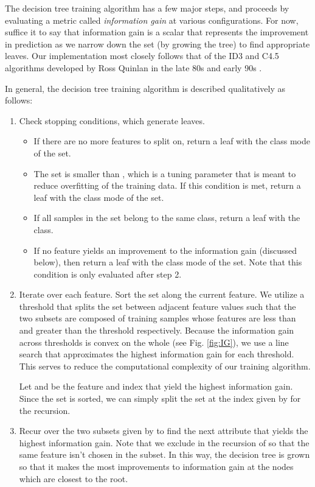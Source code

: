 The decision tree training algorithm has a few major steps, and proceeds by evaluating a metric called \emph{information gain} at various configurations. For now, suffice it to say that information gain is a scalar that represents the improvement in prediction as we narrow down the set (by growing the tree) to find appropriate leaves. Our implementation most closely follows that of the ID3 and C4.5 algorithms developed by Ross Quinlan in the late 80s and early 90s \cite{wiki:id3} \cite{wiki:c45}.

\pagebreak
In general, the decision tree training algorithm is described qualitatively as follows:
%
\begin{enumerate}
\item Check stopping conditions, which generate leaves.
%
  \begin{itemize}
  \item If there are no more features to split on, return a leaf with the class mode of the set. 
  \item The set is smaller than , which is a tuning parameter that is meant to reduce overfitting of the training data. If this condition is met, return a leaf with the class mode of the set.
  \item If all samples in the set belong to the same class, return a leaf with the class.
  \item If no feature yields an improvement to the information gain (discussed below), then return a leaf with the class mode of the set. Note that this condition is only evaluated after step 2. 
  \end{itemize}
\item Iterate over each feature. Sort the set along the current feature. We utilize a threshold that splits the set between adjacent feature values such that the two subsets are composed of training samples whose features are less than and greater than the threshold respectively. Because the information gain across thresholds is convex on the whole (see Fig. \ref{fig:IG}), we use a line search that approximates the highest information gain for each threshold. This serves to reduce the computational complexity of our training algorithm.

  Let  and  be the feature and index that yield the highest information gain. Since the set is sorted, we can simply split the set at the index given by  for the recursion.
\item Recur over the two subsets given by  to find the next attribute that yields the highest information gain. Note that we exclude  in the recursion of  so that the same feature isn't chosen in the subset. In this way, the decision tree is grown so that it makes the most improvements to information gain at the nodes which are closest to the root.  
\end{enumerate}

